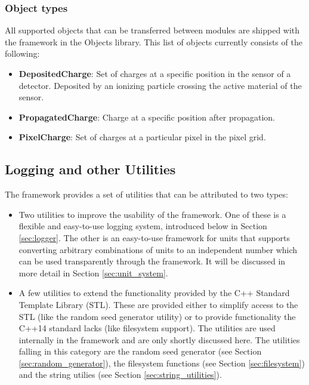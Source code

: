 \subsubsection{Object types}
All supported objects that can be transferred between modules are shipped with the framework in the Objects library. This list of objects currently consists of the following:
\begin{itemize}
\item \textbf{DepositedCharge}: Set of charges at a specific position in the sensor of a detector. Deposited by an ionizing particle crossing the active material of the sensor.
\item \textbf{PropagatedCharge}: Charge at a specific position after propagation.
\item \textbf{PixelCharge}: Set of charges at a particular pixel in the pixel grid.
\end{itemize}


\subsection{Logging and other Utilities}
\label{sec:logging_utilities}
The \apsq framework provides a set of utilities that can be attributed to two types:
\begin{itemize}
\item Two utilities to improve the usability of the framework. One of these is a flexible and easy-to-use logging system, introduced below in Section \ref{sec:logger}. The other is an easy-to-use framework for units that supports converting arbitrary combinations of units to an independent number which can  be used transparently through the framework. It will be discussed in more detail in Section \ref{sec:unit_system}.
\item A few utilities to extend the functionality provided by the C++ Standard Template Library (STL). These are provided either to simplify access to the STL (like the random seed generator utility) or to provide functionality the C++14 standard lacks (like filesystem support). The utilities are used internally in the framework and are only shortly discussed here. The utilities falling in this category are the random seed generator (see Section \ref{sec:random_generator}), the filesystem functions (see Section \ref{sec:filesystem}) and the string utilies (see Section \ref{sec:string_utilities}).
\end{itemize}

